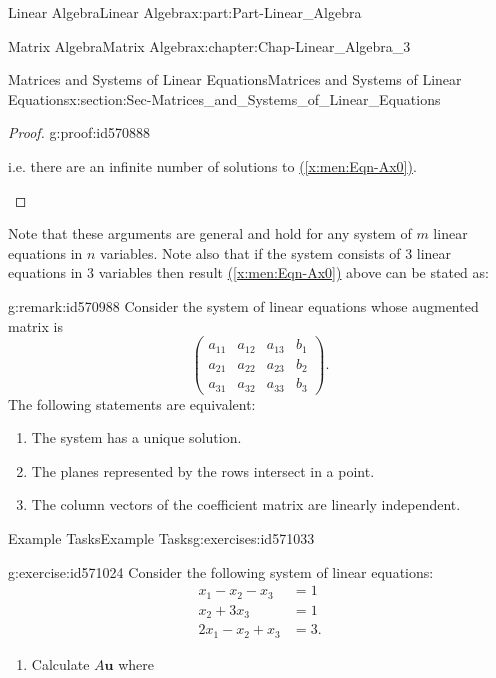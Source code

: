 \documentclass[oneside,10pt,]{book}
\newcommand{\xreffont}{\relax}
\numberwithin{equation}{section}
\newcommand{\amp}{&}
\begin{document}
\begin{partptx}{Linear Algebra}{}{Linear Algebra}{}{}{x:part:Part-Linear_Algebra}
\begin{chapterptx}{Matrix Algebra}{}{Matrix Algebra}{}{}{x:chapter:Chap-Linear_Algebra_3}
\begin{sectionptx}{Matrices and Systems of Linear Equations}{}{Matrices and Systems of Linear Equations}{}{}{x:section:Sec-Matrices_and_Systems_of_Linear_Equations}
\begin{proof}{}{g:proof:id570888}
\begin{enumerate}[label=\arabic*]
\begin{equation*}
\end{equation*}
i.e. there are an infinite number of solutions to \hyperref[x:men:Eqn-Ax0]{({\xreffont\ref{x:men:Eqn-Ax0}})}.%
\end{enumerate}
%
\end{proof}
Note that these arguments are general and hold for any system of \(m\) linear equations in \(n\) variables. Note also that if the system consists of \(3\) linear equations in \(3\) variables then result \hyperref[x:men:Eqn-Ax0]{({\xreffont\ref{x:men:Eqn-Ax0}})} above can be stated as:%
\begin{remark}{}{g:remark:id570988}%
Consider the system of linear equations whose augmented matrix is%
\begin{equation*}
\begin{pmatrix} a_{11} \amp a_{12} \amp a_{13} \amp b_1 \\ a_{21} \amp a_{22} \amp a_{23} \amp b_2 \\ a_{31} \amp a_{32} \amp a_{33} \amp b_3 \end{pmatrix}.
\end{equation*}
The following statements are equivalent:%
\begin{enumerate}[label=\arabic*]
\item{}The system has a unique solution.%
\item{}The planes represented by the rows intersect in a point.%
\item{}The column vectors of the coefficient matrix are linearly independent.%
\end{enumerate}
%
\end{remark}
%
%
\typeout{************************************************}
\typeout{************************************************}
%
\begin{exercises-subsection-numberless}{Example Tasks}{}{Example Tasks}{}{}{g:exercises:id571033}
\begin{divisionexercise}{1}{}{}{g:exercise:id571024}%
Consider the following system of linear equations:%
\begin{align*}
x_1 -x_2 -x_3 \amp =1\\
x_2 + 3x_3 \amp =1\\
2x_1 -x_2 +x_3 \amp =3.
\end{align*}
%
\begin{enumerate}[label=\alph*]
\item{}Calculate \(A\mathbf{u}\) where%
\begin{equation*}

\end{equation*}
\end{enumerate}
\end{divisionexercise}
\end{exercises-subsection-numberless}
\end{sectionptx}
\end{chapterptx}
\end{partptx}
\end{document}
